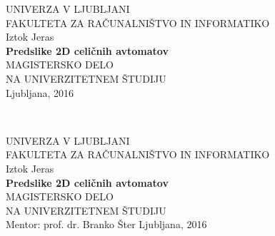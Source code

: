 \documentclass[12pt,a4paper,openany,twoside]{book}
\begin{document}
\thispagestyle{empty} 
\begin{center}
             {\large UNIVERZA V LJUBLJANI\\
                     FAKULTETA ZA RAČUNALNIŠTVO IN INFORMATIKO\\}
\vspace{3cm} {\large Iztok Jeras}\\
\vspace{2cm} {\large \textbf{Predslike 2D celičnih avtomatov}}\\
\vspace{2cm} {MAGISTERSKO DELO\\ NA UNIVERZITETNEM ŠTUDIJU}\\
\vfill       {\Large Ljubljana, 2016}
\end{center}
\newpage
\ \thispagestyle{empty}
\newpage

\thispagestyle{empty} 
\begin{center}
             {\large UNIVERZA V LJUBLJANI\\
                     FAKULTETA ZA RAČUNALNIŠTVO IN INFORMATIKO\\}
\vspace{3cm} {\large Iztok Jeras}\\
\vspace{2cm} {\large \textbf{Predslike 2D celičnih avtomatov}}\\
\vspace{2cm} {MAGISTERSKO DELO\\ NA UNIVERZITETNEM ŠTUDIJU}\\
\vspace{2cm} {\Large Mentor: prof. dr. Branko Šter}
\vfill       {\Large Ljubljana, 2016}
\end{center}
\newpage
\ \thispagestyle{empty}
\newpage

\thispagestyle{empty}
\end{document}
